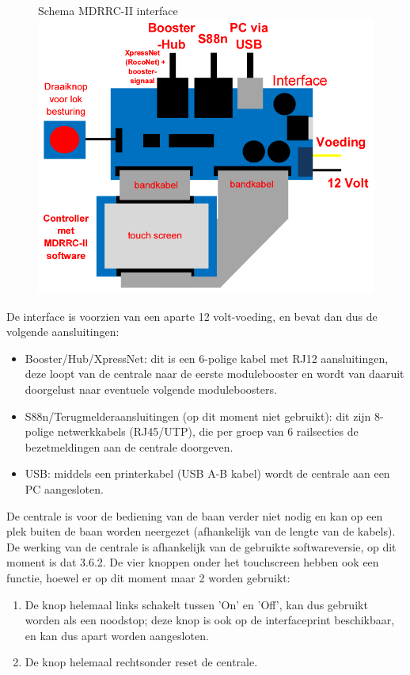 \documentclass[12pt,a4paper]{report}
\begin{document}
\begin{figure}[ht]
  \captionbox
  {Schema MDRRC-II interface\label{im:interface}}
  {\includegraphics[scale=0.5]{images/rcu_schema2}\\}
\end{figure}

De interface is voorzien van een aparte 12 volt-voeding, en bevat dan dus de volgende aansluitingen:
\begin{itemize}
\item Booster/Hub/XpressNet: dit is een 6-polige kabel met RJ12 aansluitingen, deze loopt van de centrale naar de eerste modulebooster en wordt van daaruit doorgelust naar eventuele volgende moduleboosters.
\item S88n/Terugmelderaansluitingen (op dit moment niet gebruikt): dit zijn 8-polige netwerkkabels (RJ45/UTP), die per groep van 6 railsecties de bezetmeldingen aan de centrale doorgeven.
\item USB: middels een printerkabel (USB A-B kabel) wordt de centrale aan een PC aangesloten.
\end{itemize}

De centrale is voor de bediening van de baan verder niet nodig en kan op een plek buiten de baan worden neergezet (afhankelijk van de lengte van de kabels).
De werking van de centrale is afhankelijk van de gebruikte softwareversie, op dit moment is dat 3.6.2.
De vier knoppen onder het touchscreen hebben ook een functie, hoewel er op dit moment maar 2 worden gebruikt:

\begin{enumerate}
\item De knop helemaal links schakelt tussen 'On' en 'Off', kan dus gebruikt worden als een noodstop; deze knop is ook op de interfaceprint beschikbaar, en kan dus apart worden aangesloten.
\item De knop helemaal rechtsonder reset de centrale.
\end{enumerate}
\end{document}
